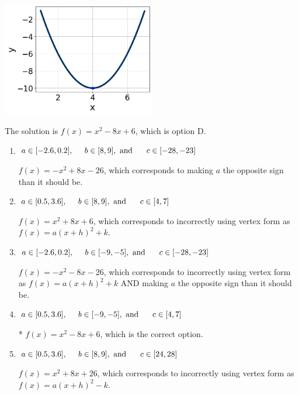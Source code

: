 \documentclass{extbook}[14pt]
\begin{document}
\begin{enumerate}
{\begin{center}
    \includegraphics[width=0.5\textwidth]{../Figures/quadraticGraphToEquationCopyC.png}
\end{center}


The solution is \( f(x) = x^{2} -8 x + 6 \), which is option D.\begin{enumerate}[label=\Alph*.]
\item \( a \in [-2.6, 0.2], \hspace*{5mm} b \in [8, 9], \text{ and } \hspace*{5mm} c \in [-28, -23] \)

$f(x)=-x^{2} +8 x -26$, which corresponds to making $a$ the opposite sign than it should be.
\item \( a \in [0.5, 3.6], \hspace*{5mm} b \in [8, 9], \text{ and } \hspace*{5mm} c \in [4, 7] \)

$f(x)=x^{2} +8 x + 6$, which corresponds to incorrectly using vertex form as $f(x) = a(x+h)^2+k$.
\item \( a \in [-2.6, 0.2], \hspace*{5mm} b \in [-9, -5], \text{ and } \hspace*{5mm} c \in [-28, -23] \)

$f(x)=-x^{2} -8 x -26$, which corresponds to incorrectly using vertex form as $f(x) = a(x+h)^2+k$ AND making $a$ the opposite sign than it should be.
\item \( a \in [0.5, 3.6], \hspace*{5mm} b \in [-9, -5], \text{ and } \hspace*{5mm} c \in [4, 7] \)

* $f(x)=x^{2} -8 x + 6$, which is the correct option.
\item \( a \in [0.5, 3.6], \hspace*{5mm} b \in [8, 9], \text{ and } \hspace*{5mm} c \in [24, 28] \)

$f(x)=x^{2} +8 x + 26$, which corresponds to incorrectly using vertex form as $f(x) = a(x+h)^2 - k$.
\end{enumerate}

}
\end{enumerate}
\end{document}
